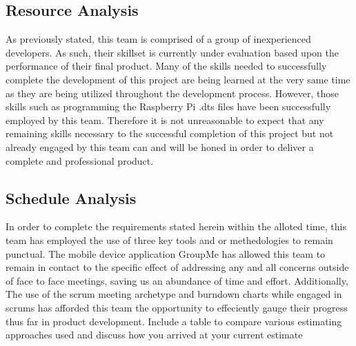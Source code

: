 \subsection{Resource Analysis}
As previously stated, this team is comprised of a group of inexperienced developers. As such, their skillset is currently under evaluation based upon the performance of their final product. Many of the skills needed to successfully complete the development of this project are being learned at the very same time as they are being utilized throughout the development process. However, those skills such as programming the Raspberry Pi .dts files have been successfully employed by this team. Therefore it is not unreasonable to expect that any remaining skills necessary to the successful completion of this project but not already engaged by this team can and will be honed in order to deliver a complete and professional product.
\subsection{Schedule Analysis}
In order to complete the requirements stated herein within the alloted time, this team has employed the use of three key tools and or methedologies to remain punctual. The mobile device application GroupMe has allowed this team to remain in contact to the specific effect of addressing any and all concerns outside of face to face meetings, saving us an abundance of time and effort. Additionally, The use of the scrum meeting archetype and burndown charts while engaged in scrums has afforded this team the opportunity to effeciently gauge their progress thus far in product development. {Include a table to compare various estimating approaches used and discuss how you arrived at your current estimate}
